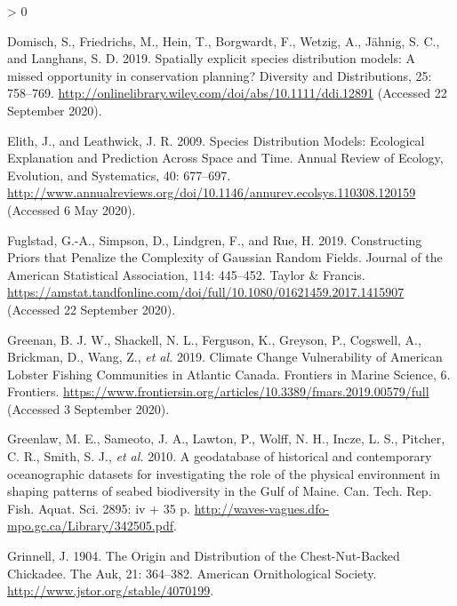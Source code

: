 \documentclass[
]{article}
\newlength{\cslhangindent}
\newenvironment{CSLReferences}[2] %
 {%
  \setlength{\parindent}{0pt}
  \ifodd #1 \everypar{\setlength{\hangindent}{\cslhangindent}}\ignorespaces\fi
  \ifnum #2 > 0
  \setlength{\parskip}{#2\baselineskip}
  \fi
 }%
 {}
\begin{document}
\begin{CSLReferences}{1}{0}
\leavevmode\hypertarget{ref-domischSpatiallyExplicitSpecies2019}{}%
Domisch, S., Friedrichs, M., Hein, T., Borgwardt, F., Wetzig, A., Jähnig, S. C., and Langhans, S. D. 2019. Spatially explicit species distribution models: {A} missed opportunity in conservation planning? Diversity and Distributions, 25: 758--769. \url{http://onlinelibrary.wiley.com/doi/abs/10.1111/ddi.12891} (Accessed 22 September 2020).

\leavevmode\hypertarget{ref-elithSpeciesDistributionModels2009}{}%
Elith, J., and Leathwick, J. R. 2009. Species {Distribution Models}: {Ecological Explanation} and {Prediction Across Space} and {Time}. Annual Review of Ecology, Evolution, and Systematics, 40: 677--697. \url{http://www.annualreviews.org/doi/10.1146/annurev.ecolsys.110308.120159} (Accessed 6 May 2020).

\leavevmode\hypertarget{ref-fuglstadConstructingPriorsThat2019}{}%
Fuglstad, G.-A., Simpson, D., Lindgren, F., and Rue, H. 2019. Constructing {Priors} that {Penalize} the {Complexity} of {Gaussian Random Fields}. Journal of the American Statistical Association, 114: 445--452. {Taylor \& Francis}. \url{https://amstat.tandfonline.com/doi/full/10.1080/01621459.2017.1415907} (Accessed 22 September 2020).

\leavevmode\hypertarget{ref-greenanClimateChangeVulnerability2019}{}%
Greenan, B. J. W., Shackell, N. L., Ferguson, K., Greyson, P., Cogswell, A., Brickman, D., Wang, Z., \emph{et al.} 2019. Climate {Change Vulnerability} of {American Lobster Fishing Communities} in {Atlantic Canada}. Frontiers in Marine Science, 6. {Frontiers}. \url{https://www.frontiersin.org/articles/10.3389/fmars.2019.00579/full} (Accessed 3 September 2020).

\leavevmode\hypertarget{ref-greenlawGeodatabaseHistoricalContemporary2010}{}%
Greenlaw, M. E., Sameoto, J. A., Lawton, P., Wolff, N. H., Incze, L. S., Pitcher, C. R., Smith, S. J., \emph{et al.} 2010. A geodatabase of historical and contemporary oceanographic datasets for investigating the role of the physical environment in shaping patterns of seabed biodiversity in the {Gulf} of {Maine}. Can. Tech. Rep. Fish. Aquat. Sci. 2895: iv + 35 p. \url{http://waves-vagues.dfo-mpo.gc.ca/Library/342505.pdf}.

\leavevmode\hypertarget{ref-grinnellOriginDistributionChestNutBacked1904}{}%
Grinnell, J. 1904. The {Origin} and {Distribution} of the {Chest}-{Nut}-{Backed Chickadee}. The Auk, 21: 364--382. {American Ornithological Society}. \url{http://www.jstor.org/stable/4070199}.


\end{CSLReferences}
\end{document}
